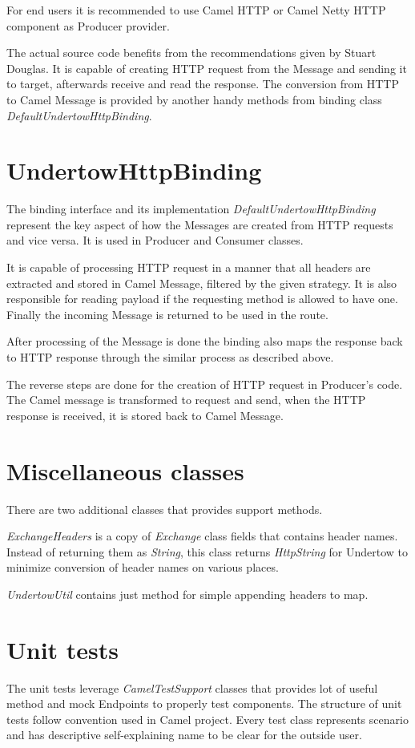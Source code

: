 \documentclass[12pt,final,oneside]{fithesis2}
\begin{document}
For end users it is recommended to use Camel HTTP or Camel Netty HTTP component as Producer provider.

The actual source code benefits from the recommendations given by Stuart Douglas. It is capable of creating HTTP request from the Message and sending it to target, afterwards receive and read the response. The conversion from HTTP to Camel Message is provided by another handy methods from binding class \textit{DefaultUndertowHttpBinding}.

\section{UndertowHttpBinding}
The binding interface and its implementation \textit{DefaultUndertowHttpBinding} represent the key aspect of how the Messages are created from HTTP requests and vice versa. It is used in Producer and Consumer classes. 

It is capable of processing HTTP request in a manner that all headers are extracted and stored in Camel Message, filtered by the given strategy. It is also responsible for reading payload if the requesting method is allowed to have one. Finally the incoming Message is returned to be used in the route.

After processing of the Message is done the binding also maps the response back to HTTP response through the similar process as described above.

The reverse steps are done for the creation of HTTP request in Producer's code. The Camel message is transformed to request and send, when the HTTP response is received, it is stored back to Camel Message.


\section{Miscellaneous classes}
There are two additional classes that provides support methods.

\textit{ExchangeHeaders} is a copy of \textit{Exchange} class fields that contains header names. Instead of returning them as \textit{String}, this class returns \textit{HttpString} for Undertow to minimize conversion of header names on various places.

\textit{UndertowUtil} contains just method for simple appending headers to map.

\section{Unit tests}
The unit tests leverage \textit{CamelTestSupport} classes that provides lot of useful method and mock Endpoints to properly test components. The structure of unit tests follow convention used in Camel project. Every test class represents scenario and has descriptive self-explaining name to be clear for the outside user.
\end{document}
